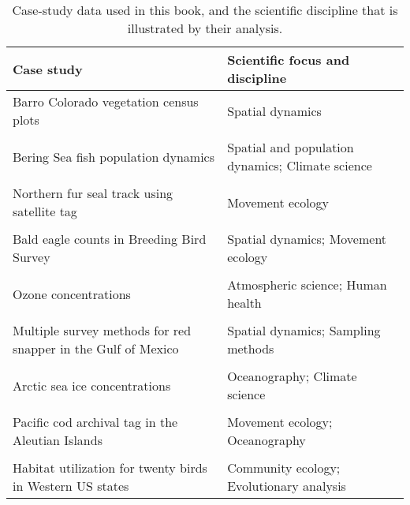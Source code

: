 \begin{table}
  \caption[List of case studies]{Case-study data used in this book, and the scientific discipline that is illustrated by their analysis.}
\begin{center}
\begin{tabularx}{\textwidth}{ | X m{2.5in} | } 
  \hline
  Case study & Scientific focus and discipline \\ 
  \hline
  
  Barro Colorado vegetation census plots & Spatial dynamics  \\ & \\ 

  Bering Sea fish population dynamics & Spatial and population dynamics; Climate science  \\ & \\
  
  Northern fur seal track using satellite tag & Movement ecology  \\ & \\
  
  Bald eagle counts in Breeding Bird Survey & Spatial dynamics; Movement ecology  \\ & \\
  
  Ozone concentrations & Atmospheric science; Human health  \\ & \\
  
  Multiple survey methods for red snapper in the Gulf of Mexico & Spatial dynamics;  Sampling methods  \\ & \\
  
  Arctic sea ice concentrations & Oceanography; Climate science  \\ & \\
  
  Pacific cod archival tag in the Aleutian Islands & Movement ecology; Oceanography  \\ & \\
  
  Habitat utilization for twenty birds in Western US states & Community ecology; Evolutionary analysis  \\
  \hline
\end{tabularx}
  \label{tab:Chap0_datasets}
\end{center}
\end{table}

